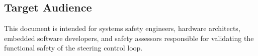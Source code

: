 \subsection{Target Audience}
This document is intended for systems safety engineers, hardware architects, embedded software developers, and safety assessors responsible for validating the functional safety of the steering control loop.
